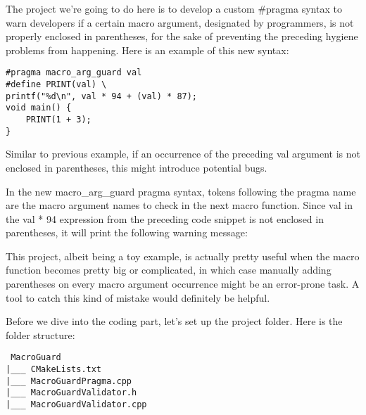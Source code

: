 The project we're going to do here is to develop a custom \#pragma syntax to warn developers if a certain macro argument, designated by programmers, is not properly enclosed in parentheses, for the sake of preventing the preceding hygiene problems from happening. Here is an example of this new syntax:

\begin{lstlisting}[style=styleCXX]
#pragma macro_arg_guard val
#define PRINT(val) \
printf("%d\n", val * 94 + (val) * 87);
void main() {
	PRINT(1 + 3);
}
\end{lstlisting}

Similar to previous example, if an occurrence of the preceding val argument is not enclosed in parentheses, this might introduce potential bugs.

In the new macro\_arg\_guard pragma syntax, tokens following the pragma name are the macro argument names to check in the next macro function. Since val in the val * 94 expression from the preceding code snippet is not enclosed in parentheses, it will print the following warning message:


This project, albeit being a toy example, is actually pretty useful when the macro function becomes pretty big or complicated, in which case manually adding parentheses on every macro argument occurrence might be an error-prone task. A tool to catch this kind of mistake would definitely be helpful.

Before we dive into the coding part, let's set up the project folder. Here is the folder structure:

\begin{tcolorbox}[colback=white,colframe=black]
\tt
{}
MacroGuard \\
\hspace*{0.5cm}|\_\_\_ CMakeLists.txt \\
\hspace*{0.5cm}|\_\_\_ MacroGuardPragma.cpp \\
\hspace*{0.5cm}|\_\_\_ MacroGuardValidator.h \\
\hspace*{0.5cm}|\_\_\_ MacroGuardValidator.cpp
\end{tcolorbox}

